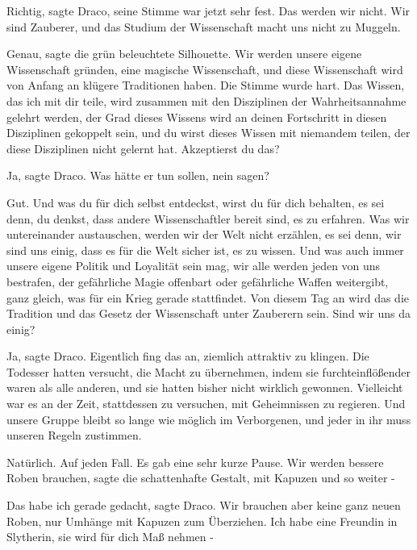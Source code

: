 \glqq Richtig\grqq{}, sagte Draco, seine Stimme war jetzt sehr fest. \glqq Das
werden wir nicht. Wir sind Zauberer, und das Studium der Wissenschaft macht uns
nicht zu Muggeln.\grqq{}

\glqq Genau\grqq{}, sagte die grün beleuchtete Silhouette. \glqq Wir werden
unsere eigene Wissenschaft gründen, eine magische Wissenschaft, und diese
Wissenschaft wird von Anfang an klügere Traditionen haben.\grqq{} Die Stimme
wurde hart. \glqq Das Wissen, das ich mit dir teile, wird zusammen mit den
Disziplinen der Wahrheitsannahme gelehrt werden, der Grad dieses Wissens wird an
deinen Fortschritt in diesen Disziplinen gekoppelt sein, und du wirst dieses
Wissen mit niemandem teilen, der diese Disziplinen nicht gelernt hat.
Akzeptierst du das?\grqq{}

\glqq Ja\grqq{}, sagte Draco. Was hätte er tun sollen, nein sagen?

\glqq Gut. Und was du für dich selbst entdeckst, wirst du für dich behalten, es
sei denn, du denkst, dass andere Wissenschaftler bereit sind, es zu erfahren.
Was wir untereinander austauschen, werden wir der Welt nicht erzählen, es sei
denn, wir sind uns einig, dass es für die Welt sicher ist, es zu wissen. Und was
auch immer unsere eigene Politik und Loyalität sein mag, wir alle werden jeden
von uns bestrafen, der gefährliche Magie offenbart oder gefährliche Waffen
weitergibt, ganz gleich, was für ein Krieg gerade stattfindet. Von diesem Tag an
wird das die Tradition und das Gesetz der Wissenschaft unter Zauberern sein.
Sind wir uns da einig?\grqq{}

\glqq Ja\grqq{}, sagte Draco. Eigentlich fing das an, ziemlich attraktiv zu
klingen. Die Todesser hatten versucht, die Macht zu übernehmen, indem sie
furchteinflößender waren als alle anderen, und sie hatten bisher nicht wirklich
gewonnen. Vielleicht war es an der Zeit, stattdessen zu versuchen, mit
Geheimnissen zu regieren. \glqq Und unsere Gruppe bleibt so lange wie möglich im
Verborgenen, und jeder in ihr muss unseren Regeln zustimmen.\grqq{}

\glqq Natürlich. Auf jeden Fall.\grqq{} Es gab eine sehr kurze Pause. \glqq Wir
werden bessere Roben brauchen\grqq{}, sagte die schattenhafte Gestalt, \glqq
mit Kapuzen und so weiter -\grqq{}

\glqq Das habe ich gerade gedacht\grqq{}, sagte Draco. \glqq Wir brauchen aber
keine ganz neuen Roben, nur Umhänge mit Kapuzen zum Überziehen. Ich habe eine
Freundin in Slytherin, sie wird für dich Maß nehmen -\grqq{}

